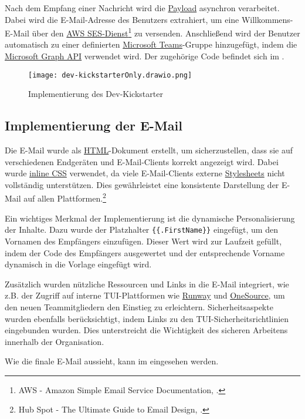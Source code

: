 Nach dem Empfang einer Nachricht wird die \hyperlink{Payload}{\textcolor{AOBlau}{Payload}} asynchron verarbeitet. Dabei wird die E-Mail-Adresse des Benutzers extrahiert, um eine Willkommens-E-Mail über den \hyperlink{AWSSESClient}{\textcolor{AOBlau}{AWS SES-Dienst}}\footnote{AWS - Amazon Simple Email Service Documentation, \cite{aws2023ses}.} zu versenden. Anschließend wird der Benutzer automatisch zu einer definierten \hyperlink{MicrosoftTeams}{\textcolor{AOBlau}{Microsoft Teams}}-Gruppe hinzugefügt, indem die \hyperlink{MicrosoftGraphAPI}{\textcolor{AOBlau}{Microsoft Graph API}} verwendet wird.
Der zugehörige Code befindet sich im .

\begin{figure}[h]
    \centering
    \texttt{[image: dev-kickstarterOnly.drawio.png]}
    \caption{Implementierung des Dev-Kickstarter}
\end{figure}

\subsection{Implementierung der E-Mail}
\label{sec:ImplementierungGeschaeftslogik}

Die E-Mail wurde als \hyperlink{HTML}{\textcolor{AOBlau}{HTML}}-Dokument erstellt, um sicherzustellen, dass sie auf verschiedenen Endgeräten und E-Mail-Clients korrekt angezeigt wird. Dabei wurde \hyperlink{CSS}{\textcolor{AOBlau}{inline CSS}} verwendet, da viele E-Mail-Clients externe \hyperlink{CSS}{\textcolor{AOBlau}{Stylesheets}} nicht vollständig unterstützen. Dies gewährleistet eine konsistente Darstellung der E-Mail auf allen Plattformen.\footnote{Hub Spot - The Ultimate Guide to Email Design, \cite{HubSpot}.}

Ein wichtiges Merkmal der Implementierung ist die dynamische Personalisierung der Inhalte. Dazu wurde der Platzhalter \texttt{\{\{.FirstName\}\}} eingefügt, um den Vornamen des Empfängers einzufügen. Dieser Wert wird zur Laufzeit gefüllt, indem der Code des Empfängers ausgewertet und der entsprechende Vorname dynamisch in die Vorlage eingefügt wird.

Zusätzlich wurden nützliche Ressourcen und Links in die E-Mail integriert, wie z.B. der Zugriff auf interne TUI-Plattformen wie  \hyperlink{Runway}{\textcolor{AOBlau}{Runway}} und \hyperlink{OneSource}{\textcolor{AOBlau}{OneSource}}, um den neuen Teammitgliedern den Einstieg zu erleichtern. Sicherheitsaspekte wurden ebenfalls berücksichtigt, indem Links zu den TUI-Sicherheitsrichtlinien eingebunden wurden. Dies unterstreicht die Wichtigkeit des sicheren Arbeitens innerhalb der Organisation.

Wie die finale E-Mail aussieht, kann im  eingesehen werden.
